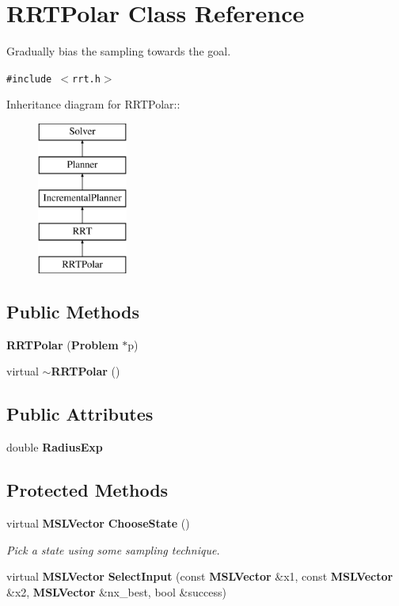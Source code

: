 \section{RRTPolar  Class Reference}
\label{class_RRTPolar}
Gradually bias the sampling towards the goal. 


{\tt \#include $<$rrt.h$>$}

Inheritance diagram for RRTPolar::\begin{figure}[H]
\begin{center}
\leavevmode
\includegraphics[height=5cm]{class_RRTPolar}
\end{center}
\end{figure}
\subsection*{Public Methods}
\begin{CompactItemize}
\item 
{\bf RRTPolar} ({\bf Problem} $\ast$p)
\item 
virtual {\bf $\sim$RRTPolar} ()
\end{CompactItemize}
\subsection*{Public Attributes}
\begin{CompactItemize}
\item 
double {\bf Radius\-Exp}
\end{CompactItemize}
\subsection*{Protected Methods}
\begin{CompactItemize}
\item 
virtual {\bf MSLVector} {\bf Choose\-State} ()
\begin{CompactList}\small\item\em Pick a state using some sampling technique.\item\end{CompactList}\item 
virtual {\bf MSLVector} {\bf Select\-Input} (const {\bf MSLVector} \&x1, const {\bf MSLVector} \&x2, {\bf MSLVector} \&nx\_\-best, bool \&success)
\end{CompactItemize}


